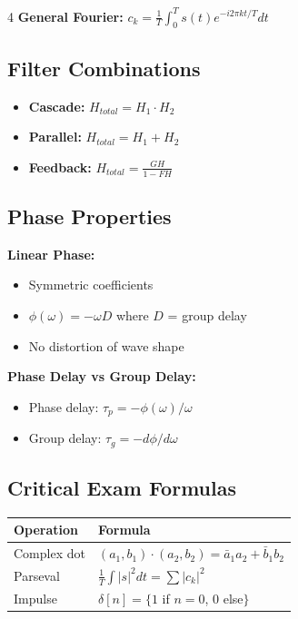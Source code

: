 \documentclass[8pt,landscape,a4paper]{article}
\begin{document}
\begin{multicols}{4}
\textbf{General Fourier:}
$c_k = \frac{1}{T}\int_0^T s(t)e^{-i2\pi kt/T}dt$

\subsection*{Filter Combinations}
\begin{itemize}
\item \textbf{Cascade:} $H_{total} = H_1 \cdot H_2$
\item \textbf{Parallel:} $H_{total} = H_1 + H_2$
\item \textbf{Feedback:} $H_{total} = \frac{GH}{1-FH}$
\end{itemize}


\subsection*{Phase Properties}
\textbf{Linear Phase:}
\begin{itemize}
\item Symmetric coefficients
\item $\phi(\omega) = -\omega D$ where $D$ = group delay
\item No distortion of wave shape
\end{itemize}

\textbf{Phase Delay vs Group Delay:}
\begin{itemize}
\item Phase delay: $\tau_p = -\phi(\omega)/\omega$
\item Group delay: $\tau_g = -d\phi/d\omega$
\end{itemize}

\subsection*{Critical Exam Formulas}
\begin{tabular}{|l|l|}
\hline
\textbf{Operation} & \textbf{Formula} \\
\hline
Complex dot & $(a_1,b_1)\cdot(a_2,b_2) = \bar{a}_1a_2 + \bar{b}_1b_2$ \\
Parseval & $\frac{1}{T}\int|s|^2dt = \sum|c_k|^2$ \\
Impulse & $\delta[n] = \{1$ if $n=0$, $0$ else$\}$ \\
\hline
\end{tabular}

\end{multicols}
\end{document}
